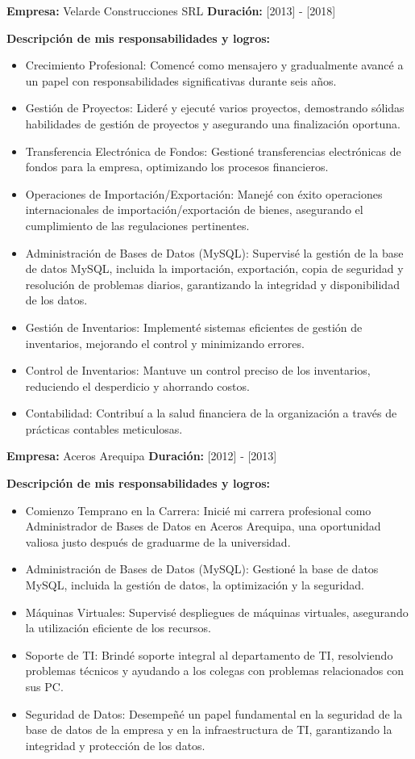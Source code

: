 \documentclass[a4paper,10pt]{article}
\begin{document}
\textbf{Empresa:} Velarde Construcciones SRL  
\textbf{Duración:} [2013] - [2018]

\textbf{Descripción de mis responsabilidades y logros:}
\begin{itemize}
    \item Crecimiento Profesional: Comencé como mensajero y gradualmente avancé a un papel con responsabilidades significativas durante seis años.
    \item Gestión de Proyectos: Lideré y ejecuté varios proyectos, demostrando sólidas habilidades de gestión de proyectos y asegurando una finalización oportuna.
    \item Transferencia Electrónica de Fondos: Gestioné transferencias electrónicas de fondos para la empresa, optimizando los procesos financieros.
    \item Operaciones de Importación/Exportación: Manejé con éxito operaciones internacionales de importación/exportación de bienes, asegurando el cumplimiento de las regulaciones pertinentes.
    \item Administración de Bases de Datos (MySQL): Supervisé la gestión de la base de datos MySQL, incluida la importación, exportación, copia de seguridad y resolución de problemas diarios, garantizando la integridad y disponibilidad de los datos.
    \item Gestión de Inventarios: Implementé sistemas eficientes de gestión de inventarios, mejorando el control y minimizando errores.
    \item Control de Inventarios: Mantuve un control preciso de los inventarios, reduciendo el desperdicio y ahorrando costos.
    \item Contabilidad: Contribuí a la salud financiera de la organización a través de prácticas contables meticulosas.
\end{itemize}

\textbf{Empresa:} Aceros Arequipa  
\textbf{Duración:} [2012] - [2013]

\textbf{Descripción de mis responsabilidades y logros:}
\begin{itemize}
    \item Comienzo Temprano en la Carrera: Inicié mi carrera profesional como Administrador de Bases de Datos en Aceros Arequipa, una oportunidad valiosa justo después de graduarme de la universidad.
    \item Administración de Bases de Datos (MySQL): Gestioné la base de datos MySQL, incluida la gestión de datos, la optimización y la seguridad.
    \item Máquinas Virtuales: Supervisé despliegues de máquinas virtuales, asegurando la utilización eficiente de los recursos.
    \item Soporte de TI: Brindé soporte integral al departamento de TI, resolviendo problemas técnicos y ayudando a los colegas con problemas relacionados con sus PC.
    \item Seguridad de Datos: Desempeñé un papel fundamental en la seguridad de la base de datos de la empresa y en la infraestructura de TI, garantizando la integridad y protección de los datos.
\end{itemize}
\end{document}
